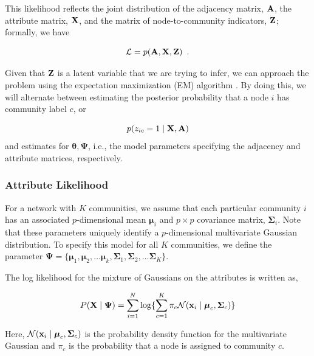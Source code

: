 This likelihood reflects the joint distribution of the adjacency matrix, ${\bf A}$, the attribute matrix, ${\bf X}$, and the matrix of node-to-community indicators, ${\bf Z}$; formally, we have 

\begin{equation}
\mathcal{L}=p({\bf A},{\bf X},{\bf Z})\enspace. 
\end{equation}

Given that ${\bf Z}$ is a latent variable that we are trying to infer, we can approach the problem using the expectation maximization (EM) algorithm \cite{dempster}. By doing this, we will alternate between estimating the posterior probability that a node $i$ has community label $c$, or

\begin{equation}
\label{post}
p(z_{ic}=1\mid {\bf X,A})
\end{equation} 
and estimates for ${\boldsymbol \theta, \boldsymbol \Psi}$, i.e., the model parameters specifying the adjacency and attribute matrices, respectively. 

\subsubsection{Attribute Likelihood}

For a network with $K$ communities, we assume that each particular community $i$ has an associated $p$-dimensional mean ${\boldsymbol \mu}_{i}$ and $p \times p$ covariance matrix, ${\boldsymbol \Sigma}_{i}$. Note that these parameters uniquely identify a $p$-dimensional multivariate Gaussian distribution. To specify this model for all $K$ communities, we define the parameter ${\boldsymbol \Psi}=\{{\boldsymbol \mu}_{1},{\boldsymbol \mu}_{2},\dots {\boldsymbol \mu}_{k},{\boldsymbol \Sigma}_{1},{\boldsymbol \Sigma}_{2},\dots {\boldsymbol \Sigma}_{K}\}$. 

The log likelihood for the mixture of Gaussians on the attributes is written as,

\begin{equation}
P({\bf X} \mid {\boldsymbol \Psi})=\sum_{i=1}^{N}\log\{\sum_{c=1}^{K}\pi_{c}\mathcal{N}({\bf x}_{i}\mid {\boldsymbol \mu}_{c},{\boldsymbol \Sigma}_{c})   \}
\end{equation}

%
Here, $\mathcal{N}({\bf x}_{i} \mid {\boldsymbol \mu}_{c},{\boldsymbol \Sigma}_{c})$ is the probability density function for the multivariate Gaussian and $\pi_{c}$ is the probability that a node is assigned to community $c$.

